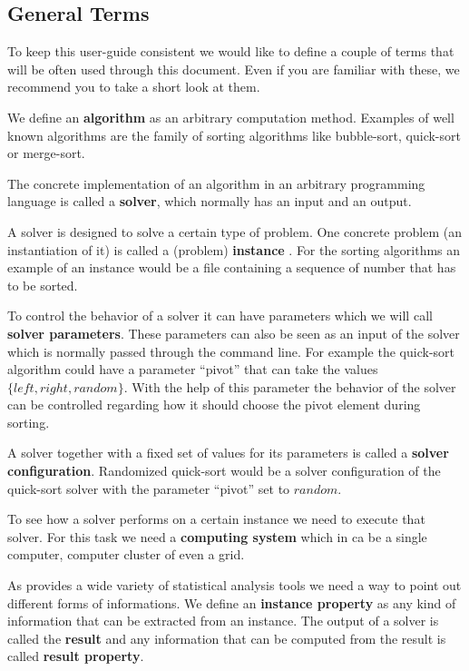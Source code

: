 
\subsection{General Terms}
\label{generalterms}
To keep this user-guide consistent we would like to define a couple of terms that will be often used through this document. Even if you are familiar with these, we recommend you to take a short look at them.


 We define an \textbf{algorithm} as an arbitrary computation method.\marginlabel{\Eexample}  Examples of well known algorithms are the family of sorting algorithms like bubble-sort, quick-sort or merge-sort.

 The concrete implementation of an algorithm in an arbitrary programming language is called a \textbf{solver}, which normally has an input and an output. 

A solver is designed to solve a certain type of problem.  One concrete problem (an instantiation of it) is called a (problem) \textbf{instance} . \marginlabel{\Eexample}For the sorting algorithms an example of an instance would be a file containing a sequence of number that has to be sorted.

 To control the behavior of a solver it can have parameters which we will call \textbf{solver parameters}. These parameters can  also be seen as an input of the solver which is normally passed through the command line. For example the quick-sort algorithm could have a parameter ``pivot'' that can take the values $\{left,right,random\}$. With the help of this parameter the behavior of the solver can be controlled regarding how it should choose the pivot element during sorting. 

 A solver together with a fixed set of values for its parameters is called a \textbf{solver configuration}. Randomized quick-sort would be a solver configuration of the quick-sort solver with the parameter ``pivot'' set to $random$. 

 To see how a solver performs on a certain instance we need to execute that solver. For this task we need a \textbf{computing system} which in \edacc ca be a single computer, computer cluster of even a grid. 

As \edacc provides a wide variety of statistical analysis tools we need a way to point out different forms of informations.   We define an \textbf{instance property} as any kind of information that can be extracted from an instance.  The output of a solver is called the \textbf{result} and any information that can be computed from the result is called \textbf{result property}. 


